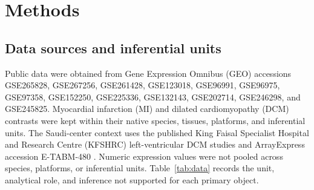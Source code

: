 \documentclass[preprint,11pt]{elsarticle}
\begin{document}
\section{Methods}
\subsection{Data sources and inferential units}
Public data were obtained from Gene Expression Omnibus (GEO) accessions GSE265828, GSE267256, GSE261428, GSE123018, GSE96991, GSE96975, GSE97358, GSE152250, GSE225336, GSE132143, GSE202714, GSE246298, and GSE245825. Myocardial infarction (MI) and dilated cardiomyopathy (DCM) contrasts were kept within their native species, tissues, platforms, and inferential units. The Saudi-center context uses the published King Faisal Specialist Hospital and Research Centre (KFSHRC) left-ventricular DCM studies and ArrayExpress accession E-TABM-480 \cite{Colak2009,Colak2016}. Numeric expression values were not pooled across species, platforms, or inferential units. Table~\ref{tab:data} records the unit, analytical role, and inference not supported for each primary object.
\end{document}
